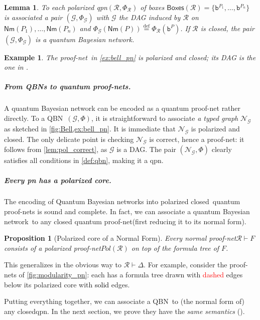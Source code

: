 \documentclass[10pt,a4paper]{article}
\newcommand*{\defeq}{\stackrel{\text{def}}{=}}
\newcommand{\der}{\vdash}
\newcommand{\Nm}[1]{\mathsf{Nm}(#1)}
\newcommand*{\somepn}{\mathcal{R}}
\newcommand*{\G}{\mathcal{G}}
\newcommand{\netN}{\mathcal N}
\newcommand{\N}{\netN}
\newcommand{\Net}{\N}
\newcommand{\netR}{\mathcal R}
\newcommand{\R}{\netR}
\newcommand{\bbox}{\mathtt{b}}
\newcommand{\Boxes}[1]{\mathsf{Boxes}(#1)}
\newcommand{\pol}[1]{\mathit{Pol}({#1})}
\newcommand{\BN}{Bayesian network\xspace}
\newcommand{\BNs}{Bayesian networks\xspace}
\newcommand*{\QBN}{quantum Bayesian network}
\newcommand*{\QBNs}{Quantum Bayesian networks\xspace}
\newcommand*{\qqbn}{\textsf{QBN}}
\newcommand*{\qpn}{quantum proof-net\xspace}
\newcommand*{\qpns}{quantum proof-nets\xspace}
\newcommand*{\qbpn}{\textsf{qpn}\xspace}
\newcommand*{\good}{closed\xspace}
\newcommand{\pn}{proof-net\xspace}
\newcommand{\pns}{proof-nets\xspace}
\newtheorem{lemma}[theorem]{Lemma}
\newtheorem{proposition}[theorem]{Proposition}
\newtheorem{example}[theorem]{Example}
\begin{document}
\begin{lemma}
To each \emph{polarized} \qbpn $(\somepn,\Phi_\somepn)$ of boxes $\Boxes{\somepn}=\{\bbox^{P_1}, \dots, \bbox^{P_n}\}$ is associated a pair $(\G, \Phi_\G)$ with $\G$ the DAG induced by $\somepn$ on $\Nm{P_1}, \dots, \Nm{P_n}$ and $\Phi_\G(\Nm P)\defeq \Phi_\somepn(\bbox^P)$.
If $\somepn$ is \good, the pair $(\G, \Phi_\G)$ is a \QBN.
\end{lemma}
 
\begin{example}
The \pn\ in \cref{ex:bell_pn} is polarized and \good; its DAG is the one in .
\end{example}


\subparagraph{From \qqbn s to \qpns.}

A quantum Bayesian network can be encoded as a \qpn rather directly.
To a \qqbn\ $(\G, \Phi)$, it is straightforward to associate \emph{a typed graph} $\Net_\G$ as sketched in \cref{fig:Bell,ex:bell_pn}.
It is immediate that $\Net_\G$ is polarized and \good.
The only delicate point is checking $\Net_\G$ is correct, hence a proof-net: it follows from \cref{lem:pol_correct}, as $\G$ is a DAG.
The pair $(\Net_\G, \Phi)$ clearly satisfies all conditions in \cref{def:qbn}, making it a \qbpn.

\subparagraph{Every pn has a polarized core.}

The encoding of \QBNs into polarized \good\ \qpns is sound and complete.
In fact, we can associate a \QBN\ to any \good \qpn (first reducing it to its normal form).

\begin{proposition}[Polarized core of a Normal Form]
Every \emph{normal} \pn $\somepn \der F$ consists of a polarized \pn $\pol{\somepn}$ on top of the formula tree of $F$.
\end{proposition}
This generalizes in the obvious way to $\somepn \der \Delta$.
For example, consider the proof-nets of \cref{fig:modularity_pn}: each has a formula tree drawn with \textcolor{red}{dashed} edges below its polarized core with \textcolor{black}{solid} edges.

Putting everything together, we can associate a \qqbn\ to (the normal form of) any \good \qbpn.
In the next section, we prove they have the \emph{same semantics} ().
\end{document}
